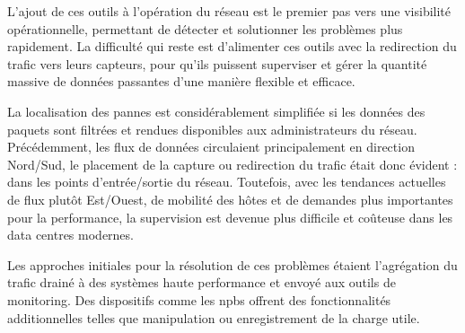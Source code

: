 L'ajout de ces outils à l'opération du réseau est le premier pas vers une visibilité opérationnelle, permettant de détecter et solutionner les problèmes plus rapidement. La difficulté qui reste est d'alimenter ces outils avec la redirection du trafic vers leurs capteurs, pour qu'ils puissent superviser et gérer la quantité massive de données passantes d'une manière flexible et efficace. 

La localisation des pannes est considérablement simplifiée si les données des paquets sont filtrées et rendues disponibles aux administrateurs du réseau. Précédemment, les flux de données circulaient principalement en direction Nord/Sud, le placement de la capture ou redirection du trafic était donc évident : dans les points d'entrée/sortie du réseau. Toutefois, avec les tendances actuelles de flux plutôt Est/Ouest, de mobilité des hôtes et de demandes plus importantes pour la performance, la supervision est devenue plus difficile et coûteuse dans les data centres modernes.

Les approches initiales pour la résolution de ces problèmes étaient l'agrégation du trafic drainé à des systèmes haute performance et envoyé aux outils de monitoring. Des dispositifs comme les \glspl{npb} offrent des fonctionnalités additionnelles telles que manipulation ou enregistrement de la charge utile. 

